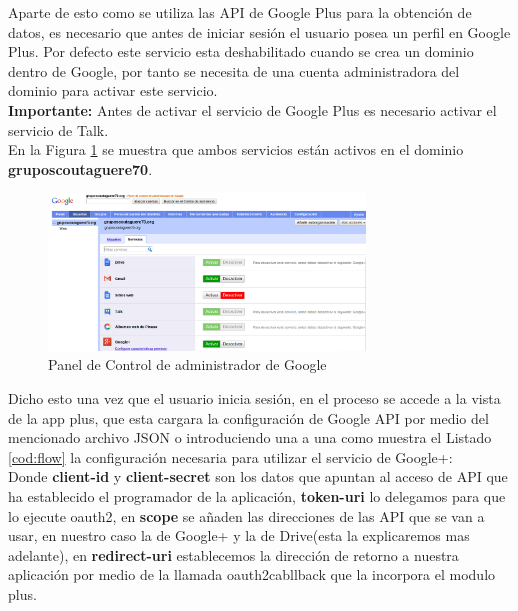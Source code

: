 Aparte de esto como se utiliza las API de Google Plus para la obtención de datos, es necesario que antes de iniciar sesión el usuario posea un perfil en Google Plus.
Por defecto este servicio esta deshabilitado cuando se crea un dominio dentro de Google, por tanto se necesita de una cuenta administradora del dominio para activar este servicio.\\

\textbf{Importante:} Antes de activar el servicio de Google Plus es necesario activar el servicio de Talk.\\

En la Figura \ref{fig:panel} se muestra  que ambos servicios están activos en el dominio \textbf{gruposcoutaguere70}.\\

\begin{figure}[H]
\begin{center}
\includegraphics[width=0.75\textwidth]{images/panel_google.jpg}
\caption{Panel de Control de administrador de Google}
\label{fig:panel}
\end{center}
\end{figure}


Dicho esto una vez que el usuario inicia sesión, en el proceso se accede a la vista de la app plus, que esta cargara la configuración de Google API por medio del mencionado archivo JSON o introduciendo una a una 
como muestra el Listado \ref{cod:flow} la configuración necesaria para utilizar el servicio de Google+:\\



Donde \textbf{client-id} y \textbf{client-secret} son los datos que apuntan al acceso de API que ha establecido el programador de la aplicación, \textbf{token-uri} lo delegamos para que lo ejecute oauth2, en \textbf{scope}
se añaden las direcciones de las API que se van a usar, en nuestro caso la de Google+ y la de Drive(esta la explicaremos mas adelante), en \textbf{redirect-uri} establecemos la dirección de retorno a nuestra aplicación 
por medio de la llamada oauth2cabllback que la incorpora el modulo plus.


